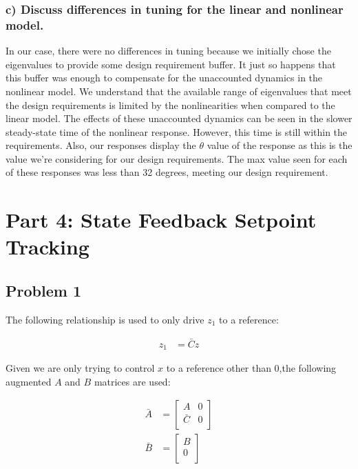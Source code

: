 \documentclass[12pt, letterpaper, onecolumn]{article}
\begin{document}
\subsubsection*{c) Discuss differences in tuning for the linear and nonlinear model.}
In our case, there were no differences in tuning because we initially chose the eigenvalues to provide some design requirement buffer. It just so happens that this buffer was enough to compensate for the unaccounted dynamics in the nonlinear model. We understand that the available range of eigenvalues that meet the design requirements is limited by the nonlinearities when compared to the linear model. The effects of these unaccounted dynamics can be seen in the slower steady-state time of the nonlinear response. However, this time is still within the requirements. Also, our responses display the $\theta$ value of the response as this is the value we're considering for our design requirements. The max value seen for each of these responses was less than 32 degrees, meeting our design requirement.

\clearpage

\section*{Part 4: State Feedback Setpoint Tracking}

\subsection*{Problem 1}
The following relationship is used to only drive $z_1$ to a reference:

\begin{equation*}
    \begin{split}
        z_1 & = \bar{C}z
    \end{split}
\end{equation*}

Given we are only trying to control $x$ to a reference other than 0,the following augmented $A$ and $B$ matrices are used:

\begin{equation*}
    \begin{split}
        \bar{A} & =
        \begin{bmatrix}
            A       & 0 \\
            \bar{C} & 0 \\
        \end{bmatrix} \\
        \bar{B} & =
        \begin{bmatrix}
            B \\
            0 \\
        \end{bmatrix}
    \end{split}
\end{equation*}
\end{document}
